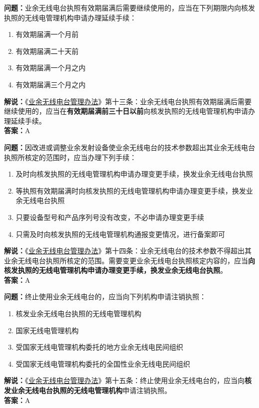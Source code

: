 \textbf{问题：}业余无线电台执照有效期届满后需要继续使用的，应当在下列期限内向核发执照的无线电管理机构申请办理延续手续：
\begin{enumerate}[label=\Alph*), leftmargin=1.5cm]
	\item 有效期届满一个月前
	\item 有效期届满二十天前
	\item 有效期届满一个月之内
	\item 有效期届满三个月之内
\end{enumerate}
\textbf{解说：}《\href{https://www.miit.gov.cn/jgsj/zfs/bmgz/art/2020/art_147b69815b3641caad9047735f94c860.html}{业余无线电台管理办法}》第十三条：业余无线电台执照有效期届满后需要继续使用的，应当在\textbf{有效期届满前三十日以前}向核发执照的无线电管理机构申请办理延续手续。\\\textbf{答案：}A %

\textbf{问题：}因改进或调整业余发射设备使业余无线电台的技术参数超出其业余无线电台执照所核定的范围时，应当办理下列手续：
\begin{enumerate}[label=\Alph*), leftmargin=1.5cm]
	\item 及时向核发执照的无线电管理机构申请办理变更手续，换发业余无线电台执照
	\item 等执照有效期届满时向核发执照的无线电管理机构申请办理变更手续，换发业余无线电台执照
	\item 只要设备型号和产品序列号没有改变，不必申请办理变更手续
	\item 只需及时向核发执照的无线电管理机构通报变更情况，进行备案即可
\end{enumerate}
\textbf{解说：}《\href{https://www.miit.gov.cn/jgsj/zfs/bmgz/art/2020/art_147b69815b3641caad9047735f94c860.html}{业余无线电台管理办法}》第十四条：业余无线电台的技术参数不得超出其业余无线电台执照所核定的范围。需要变更业余无线电台执照核定内容的，应当\textbf{向核发执照的无线电管理机构申请办理变更手续，换发业余无线电台执照}。\\\textbf{答案：}A

\textbf{问题：}终止使用业余无线电台的，应当向下列机构申请注销执照：
\begin{enumerate}[label=\Alph*), leftmargin=1.5cm]
	\item 核发业余无线电台执照的无线电管理机构
	\item 国家无线电管理机构
	\item 受国家无线电管理机构委托的地方业余无线电民间组织
	\item 受国家无线电管理机构委托的全国性业余无线电民间组织
\end{enumerate}
\textbf{解说：}《\href{https://www.miit.gov.cn/jgsj/zfs/bmgz/art/2020/art_147b69815b3641caad9047735f94c860.html}{业余无线电台管理办法}》第十五条：终止使用业余无线电台的，应当向\textbf{核发业余无线电台执照的无线电管理机构}申请注销执照。\\\textbf{答案：}A

